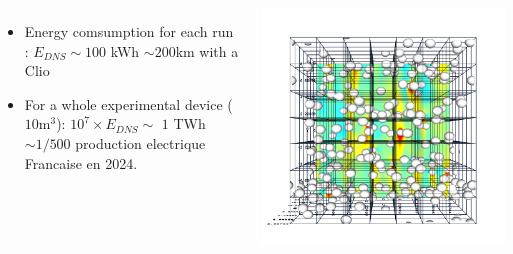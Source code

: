 \documentclass{sintefbeamer}
\begin{document}
\begin{frame}
\begin{columns}
{\begin{itemize}
 \item Energy comsumption for each run : $E_{DNS}\sim 100$ kWh $\sim 200 $km with a Clio
 \item For a whole experimental device ($10$m$^3$): $10^7\times E_{DNS} \sim$ $1$ TWh $\sim 1/500$ production electrique Francaise en 2024.
\end{itemize}
  }
  \vfill
  \centering
  \href{videos/DNS.mp4}{}
  \includegraphics[width =  \textwidth]{image/PHI_01_Ga_75.png}

  \end{columns}
\end{frame}
\end{document}
